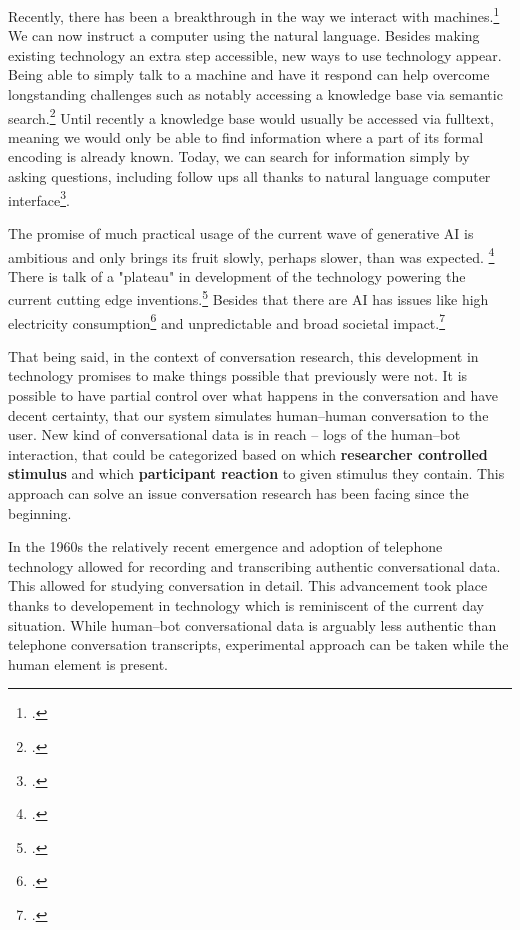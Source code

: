 \documentclass[12pt]{report}
\begin{document}
\par
Recently, there has been a breakthrough in the way we interact with machines.\footcite{sharma2024exploring}
We can now instruct a computer using the natural language.
Besides making existing technology an extra step accessible,
new ways to use technology appear.
Being able to simply talk to a machine and have it respond
can help overcome longstanding challenges
such as notably accessing a knowledge base via semantic search.\footcite{makela2005survey}
Until recently a knowledge base would usually be accessed via fulltext,
meaning we would only be able to find
information where a part of its formal encoding is already known.
Today, we can search for information simply by asking questions,
including follow ups
all thanks to natural language computer interface\footcite{hendrix1982natural}.
\par
The promise of much practical usage of the current wave of generative AI is ambitious
and only brings its fruit slowly, perhaps slower, than was expected.
\footcite{bloomberg2024openai1, reuters2024openai}
There is talk of a "plateau" in development of the technology powering
the current cutting edge inventions.\footcite{ritter2024ai}
Besides that there are AI has issues like
high electricity consumption\footcite{ritchie2024ai} and
unpredictable and broad societal impact.\footcite{hagerty2019global,baldassarre2023social}

That being said, in the context of conversation research,
this development in technology promises to make things possible that previously were not.
It is possible to have partial control over what happens in the conversation and
have decent certainty, that
our system simulates human–human conversation to the user.
New kind of conversational data is in reach –
logs of the human–bot interaction, that could be categorized based on
which \textbf{researcher controlled stimulus} and
which \textbf{participant reaction} to given stimulus
they contain.
This approach can solve an issue conversation research has been facing since the beginning.

\par
In the 1960s the relatively recent emergence and adoption of telephone technology
allowed for recording and transcribing authentic conversational data.
This allowed for studying conversation in detail.
This advancement took place thanks to developement in technology
which is reminiscent of the current day situation.
While human–bot conversational data is arguably less authentic than telephone conversation transcripts,
experimental approach can be taken while the human element is present.
\end{document}
